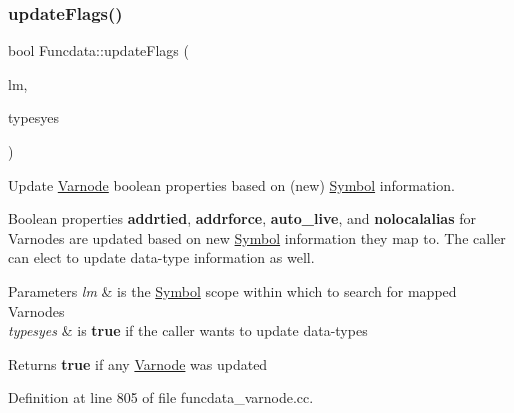 \subsubsection{\texorpdfstring{updateFlags()}{updateFlags()}}
{\footnotesize\ttfamily bool Funcdata\+::update\+Flags (\begin{DoxyParamCaption}\item[{const \mbox{\hyperlink{class_scope_local}{Scope\+Local}} $\ast$}]{lm,  }\item[{bool}]{typesyes }\end{DoxyParamCaption})}



Update \mbox{\hyperlink{class_varnode}{Varnode}} boolean properties based on (new) \mbox{\hyperlink{class_symbol}{Symbol}} information. 

Boolean properties {\bfseries{addrtied}}, {\bfseries{addrforce}}, {\bfseries{auto\+\_\+live}}, and {\bfseries{nolocalalias}} for Varnodes are updated based on new \mbox{\hyperlink{class_symbol}{Symbol}} information they map to. The caller can elect to update data-\/type information as well. 
\begin{DoxyParams}{Parameters}
{\em lm} & is the \mbox{\hyperlink{class_symbol}{Symbol}} scope within which to search for mapped Varnodes \\
\hline
{\em typesyes} & is {\bfseries{true}} if the caller wants to update data-\/types \\
\hline
\end{DoxyParams}
\begin{DoxyReturn}{Returns}
{\bfseries{true}} if any \mbox{\hyperlink{class_varnode}{Varnode}} was updated 
\end{DoxyReturn}


Definition at line 805 of file funcdata\+\_\+varnode.\+cc.

